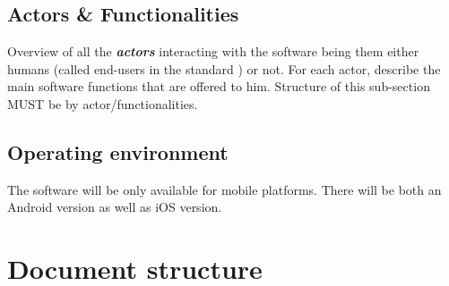 \subsection{Actors \& Functionalities}
Overview of all the \textbf{\emph{\glspl{actor}}} interacting with the software
being them either humans (called end-users in the standard
\cite{IEEE-2001-userdocumentation}) or not. For each actor, describe the main
software functions that are offered to him. Structure of this sub-section MUST
be by actor/functionalities.


\subsection{Operating environment}
The software will be only available for mobile platforms. There will be both an
Android version as well as iOS version.

\section{Document structure}







